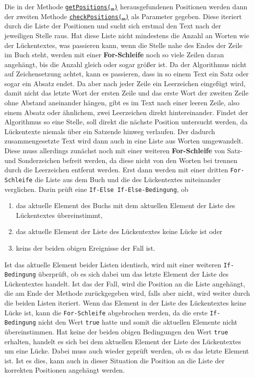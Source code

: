\documentclass[a4paper, 10pt, ngerman]{scrartcl}
\begin{document}
Die in der Methode \hyperref[sec:getPositions()]{\texttt{getPositions(\ldots)}} herausgefundenen Positionen werden dann der zweiten Methode \hyperref[sec:checkPositions()]{\texttt{checkPositions(\ldots)}} als Parameter gegeben.
Diese iteriert durch die Liste der Positionen
und sucht sich erstmal den Text nach der jeweiligen Stelle raus.
Hat diese Liste nicht mindestens die Anzahl an Worten wie der Lückentextes,
was passieren kann,
wenn die Stelle nahe des Endes der Zeile im Buch steht,
werden mit einer \textbf{For-Schleife} noch so viele Zeilen daran angehängt,
bis die Anzahl gleich oder sogar größer ist.
Da der Algorithmus nicht auf Zeichensetzung achtet,
kann es passieren,
dass in so einem Text ein Satz
oder sogar ein Absatz endet.
Da aber nach jeder Zeile ein Leerzeichen eingefügt wird,
damit nicht das letzte Wort der ersten Zeile
und das erste Wort der zweiten Zeile ohne Abstand aneinander hängen,
gibt es im Text nach einer leeren Zeile,
also einem Absatz oder ähnlichem,
zwei Leerzeichen direkt hintereinander.
Findet der Algorithmus so eine Stelle,
soll direkt die nächste Position untersucht werden,
da Lückentexte niemals über ein Satzende hinweg verlaufen.
Der dadurch zusammengesetzte Text wird dann auch in eine Liste aus Worten umgewandelt.
Diese muss allerdings zunächst noch mit einer weiteren \textbf{For-Schleife} von Satz- und Sonderzeichen befreit werden,
da diese nicht von den Worten bei trennen durch die Leerzeichen entfernt werden.
Erst dann werden mit einer dritten \texttt{For-Schleife} die Liste aus dem Buch und die des Lückentextes miteinander verglichen.
Darin prüft eine \texttt{If-Else If-Else-Bedingung},
ob
\begin{enumerate}
\item das aktuelle Element des Buchs mit dem aktuellen Element der Liste des Lückentextes übereinstimmt,
\item das aktuelle Element der Liste des Lückentextes keine Lücke ist oder
\item keins der beiden obigen Ereignisse der Fall ist.
\end{enumerate}
Ist das aktuelle Element beider Listen identisch,
wird mit einer weiteren \texttt{If-Bedingung} überprüft,
ob es sich dabei um das letzte Element der Liste des Lückentextes handelt.
Ist das der Fall,
wird die Position an die Liste angehängt,
die am Ende der Methode zurückgegeben wird,
falls aber nicht,
wird weiter durch die beiden Listen iteriert.
Wenn das Element in der Liste des Lückentextes keine Lücke ist, kann die \texttt{For-Schleife} abgebrochen werden,
da die erste \texttt{If-Bedingung} nicht den Wert \texttt{true} hatte
und somit die aktuellen Elemente nicht übereinstimmen.
Hat keine der beiden obigen Bedingungen den Wert \texttt{true} erhalten,
handelt es sich bei dem aktuellen Element der Liste des Lückentextes um eine Lücke.
Dabei muss auch wieder geprüft werden,
ob es das letzte Element ist.
Ist es dies,
kann auch in dieser Situation die Position an die Liste der korrekten Positionen angehängt werden.
\end{document}
